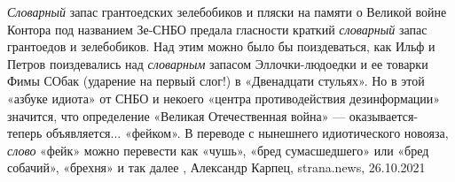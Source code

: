 \emph{Словарный} запас грантоедских зелебобиков и пляски на памяти о Великой войне
Контора под названием Зе-СНБО предала гласности краткий \emph{словарный} запас
грантоедов и зелебобиков. Над этим можно было бы поиздеваться, как Ильф и
Петров поиздевались над \emph{словарным} запасом Эллочки-людоедки и ее товарки Фимы
СОбак (ударение на первый слог!) в «Двенадцати стульях». Но в этой «азбуке
идиота» от СНБО и некоего «центра противодействия дезинформации» значится, что
определение «Великая Отечественная война» — оказывается- теперь объявляется...
«фейком». В переводе с нынешнего идиотического новояза, \emph{слово} «фейк» можно
перевести как «чушь», «бред сумасшедшего» или «бред собачий», «брехня» и так
далее
, 
Александр Карпец, strana.news, 26.10.2021
